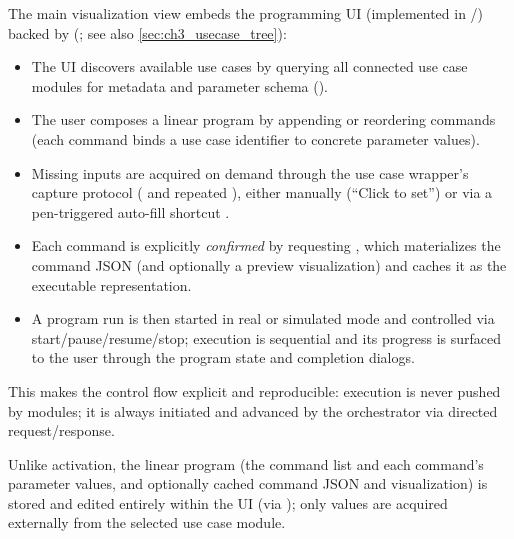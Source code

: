 The main visualization view embeds the programming UI (implemented in /) backed by  (; see also \autoref{sec:ch3_usecase_tree}):
\begin{itemize}
    \item The UI discovers available use cases  by querying all connected use case modules for metadata and parameter schema ().
    \item The user composes a linear program  by appending or reordering commands (each command binds a use case identifier to concrete parameter values).
    \item Missing  inputs are acquired on demand through the use case wrapper's capture protocol ( and repeated ), either manually (``Click to set'') or via a pen-triggered auto-fill shortcut .
    \item Each command is explicitly \emph{confirmed}  by requesting , which materializes the command JSON (and optionally a preview visualization) and caches it as the executable representation.
    \item A program run is then started in real or simulated mode  and controlled via start/pause/resume/stop; execution is sequential and its progress is surfaced to the user through the program state and completion dialogs.
\end{itemize}
This makes the control flow explicit and reproducible: execution is never pushed by modules; it is always initiated and advanced by the orchestrator via directed request/response.

Unlike activation, the linear program (the command list and each command's parameter values, and optionally cached command JSON and visualization) is stored and edited entirely within the UI (via ); only  values are acquired externally from the selected use case module.

